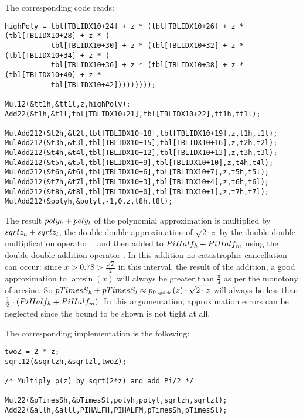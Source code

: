 The corresponding code reads:
\begin{lstlisting}[caption={High path quick phase polynomial approximation},firstnumber=1]
highPoly = tbl[TBLIDX10+24] + z * (tbl[TBLIDX10+26] + z * (tbl[TBLIDX10+28] + z * (
           tbl[TBLIDX10+30] + z * (tbl[TBLIDX10+32] + z * (tbl[TBLIDX10+34] + z * (
           tbl[TBLIDX10+36] + z * (tbl[TBLIDX10+38] + z * (tbl[TBLIDX10+40] + z *
           tbl[TBLIDX10+42]))))))));

Mul12(&tt1h,&tt1l,z,highPoly);
Add22(&t1h,&t1l,tbl[TBLIDX10+21],tbl[TBLIDX10+22],tt1h,tt1l);

MulAdd212(&t2h,&t2l,tbl[TBLIDX10+18],tbl[TBLIDX10+19],z,t1h,t1l);
MulAdd212(&t3h,&t3l,tbl[TBLIDX10+15],tbl[TBLIDX10+16],z,t2h,t2l);
MulAdd212(&t4h,&t4l,tbl[TBLIDX10+12],tbl[TBLIDX10+13],z,t3h,t3l);
MulAdd212(&t5h,&t5l,tbl[TBLIDX10+9],tbl[TBLIDX10+10],z,t4h,t4l);
MulAdd212(&t6h,&t6l,tbl[TBLIDX10+6],tbl[TBLIDX10+7],z,t5h,t5l);
MulAdd212(&t7h,&t7l,tbl[TBLIDX10+3],tbl[TBLIDX10+4],z,t6h,t6l);
MulAdd212(&t8h,&t8l,tbl[TBLIDX10+0],tbl[TBLIDX10+1],z,t7h,t7l);
MulAdd212(&polyh,&polyl,-1,0,z,t8h,t8l);
\end{lstlisting}

The result $poly_{\mathit{h}} + poly_{\mathit{l}}$ of the polynomial approximation is
multiplied by $sqrtz_{\mathit{h}} + sqrtz_{\mathit{l}}$, the double-double approximation
of $\sqrt{2 \cdot z}$ by the double-double multiplication
operator \MulDD~ and then added to $PiHalf_{\mathit{h}} + PiHalf_{\mathit{m}}$ using the
double-double addition operator \AddDD. In this addition no
catastrophic cancellation can occur: since $x > 0.78 >
\frac{\sqrt{2}}{2}$ in this interval, the result of the addition, a
good approximation to $\arcsin\left( x \right)$ will always be greater
than $\frac{\pi}{4}$ as per the monotony of arcsine.  So $pTimesS_{\mathit{h}}
+ pTimesS_{\mathit{l}} \approx p_{9\mbox{\tiny ~quick}}\left( z \right) \cdot
\sqrt{2 \cdot z}$ will always be less than $\frac{1}{2} \cdot \left(
  PiHalf_{\mathit{h}} + PiHalf_{\mathit{m}} \right)$. In this argumentation,
approximation errors can be neglected since the bound to be shown is
not tight at all.

The corresponding implementation is the following:
\begin{lstlisting}[caption={High path: square root extraction and reconstruction},firstnumber=1]
twoZ = 2 * z;
sqrt12(&sqrtzh,&sqrtzl,twoZ);

/* Multiply p(z) by sqrt(2*z) and add Pi/2 */

Mul22(&pTimesSh,&pTimesSl,polyh,polyl,sqrtzh,sqrtzl);
Add22(&allh,&alll,PIHALFH,PIHALFM,pTimesSh,pTimesSl);
\end{lstlisting}

